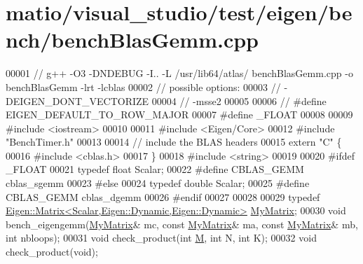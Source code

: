 \hypertarget{matio_2visual__studio_2test_2eigen_2bench_2bench_blas_gemm_8cpp_source}{}\section{matio/visual\+\_\+studio/test/eigen/bench/bench\+Blas\+Gemm.cpp}
\label{matio_2visual__studio_2test_2eigen_2bench_2bench_blas_gemm_8cpp_source}

\begin{DoxyCode}
00001 \textcolor{comment}{// g++ -O3 -DNDEBUG -I.. -L /usr/lib64/atlas/ benchBlasGemm.cpp -o benchBlasGemm -lrt -lcblas}
00002 \textcolor{comment}{// possible options:}
00003 \textcolor{comment}{//    -DEIGEN\_DONT\_VECTORIZE}
00004 \textcolor{comment}{//    -msse2}
00005 
00006 \textcolor{comment}{// #define EIGEN\_DEFAULT\_TO\_ROW\_MAJOR}
00007 \textcolor{preprocessor}{#define \_FLOAT}
00008 
00009 \textcolor{preprocessor}{#include <iostream>}
00010 
00011 \textcolor{preprocessor}{#include <Eigen/Core>}
00012 \textcolor{preprocessor}{#include "BenchTimer.h"}
00013 
00014 \textcolor{comment}{// include the BLAS headers}
00015 \textcolor{keyword}{extern} \textcolor{stringliteral}{"C"} \{
00016 \textcolor{preprocessor}{#include <cblas.h>}
00017 \}
00018 \textcolor{preprocessor}{#include <string>}
00019 
00020 \textcolor{preprocessor}{#ifdef \_FLOAT}
00021 \textcolor{keyword}{typedef} \textcolor{keywordtype}{float} Scalar;
00022 \textcolor{preprocessor}{#define CBLAS\_GEMM cblas\_sgemm}
00023 \textcolor{preprocessor}{#else}
00024 \textcolor{keyword}{typedef} \textcolor{keywordtype}{double} Scalar;
00025 \textcolor{preprocessor}{#define CBLAS\_GEMM cblas\_dgemm}
00026 \textcolor{preprocessor}{#endif}
00027 
00028 
00029 \textcolor{keyword}{typedef} \hyperlink{group___core___module_class_eigen_1_1_matrix}{Eigen::Matrix<Scalar,Eigen::Dynamic,Eigen::Dynamic>}
       \hyperlink{group___core___module_class_eigen_1_1_matrix}{MyMatrix};
00030 \textcolor{keywordtype}{void} bench\_eigengemm(\hyperlink{group___core___module_class_eigen_1_1_matrix}{MyMatrix}& mc, \textcolor{keyword}{const} \hyperlink{group___core___module_class_eigen_1_1_matrix}{MyMatrix}& ma, \textcolor{keyword}{const} 
      \hyperlink{group___core___module_class_eigen_1_1_matrix}{MyMatrix}& mb, \textcolor{keywordtype}{int} nbloops);
00031 \textcolor{keywordtype}{void} check\_product(\textcolor{keywordtype}{int} \hyperlink{group___core___module_class_eigen_1_1_matrix}{M}, \textcolor{keywordtype}{int} N, \textcolor{keywordtype}{int} K);
00032 \textcolor{keywordtype}{void} check\_product(\textcolor{keywordtype}{void});

\end{DoxyCode}
